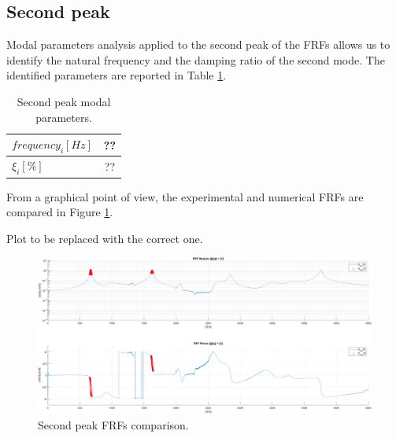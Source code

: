 \subsection{Second peak}
\label{subsec:second_peak}

Modal parameters analysis applied to the second peak of the FRFs allows us to identify the natural frequency and the damping ratio of the second mode.
The identified parameters are reported in Table \ref{tab:second_peak}.

\begin{table}[H]
    \centering
    \begin{tabular}{lc}
        \hline
        $frequency_i [Hz]$ & ?? \\
        \hline
        $\xi_i [\%]$       & ?? \\
        \hline
    \end{tabular}
    \caption{Second peak modal parameters.}
    \label{tab:second_peak}
\end{table}

From a graphical point of view, the experimental and numerical FRFs are compared in Figure \ref{fig:second_peak}.

\begin{center}
    \huge{Plot to be replaced with the correct one.}
\end{center}

\begin{figure}[H]
    \centering
    \includegraphics[width=\textwidth]{img/MATLAB/Part_B/Comparison_FRF_1.png}
    \caption{Second peak FRFs comparison.}
    \label{fig:second_peak}
\end{figure}
